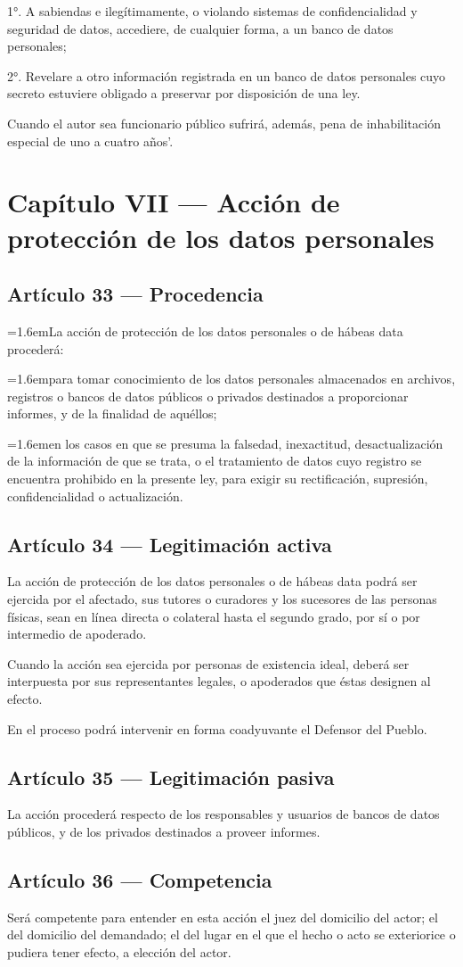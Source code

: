 \documentclass[10pt,a4paper]{article}
\newcommand{\articulo}[1]{\subsection{#1}}
\newcommand{\inciso}[2]{\par{\hangindent=1.6em\hangafter=1\makebox[1.6em][l]{#1}#2\par}}
\begin{document}
1°. A sabiendas e ilegítimamente, o violando sistemas de confidencialidad y seguridad de datos, accediere, de cualquier forma, a un banco de datos personales;

2°. Revelare a otro información registrada en un banco de datos personales cuyo secreto estuviere obligado a preservar por disposición de una ley.

Cuando el autor sea funcionario público sufrirá, además, pena de inhabilitación especial de uno a cuatro años'.

\section{Capítulo VII --- Acción de protección de los datos personales}
\articulo{Artículo 33 --- Procedencia}
\inciso{1.}{La acción de protección de los datos personales o de hábeas data procederá:}

\inciso{a)}{para tomar conocimiento de los datos personales almacenados en archivos, registros o bancos de datos públicos o privados destinados a proporcionar informes, y de la finalidad de aquéllos;}

\inciso{b)}{en los casos en que se presuma la falsedad, inexactitud, desactualización de la información de que se trata, o el tratamiento de datos cuyo registro se encuentra prohibido en la presente ley, para exigir su rectificación, supresión, confidencialidad o actualización.}

\articulo{Artículo 34 --- Legitimación activa}
La acción de protección de los datos personales o de hábeas data podrá ser ejercida por el afectado, sus tutores o curadores y los sucesores de las personas físicas, sean en línea directa o colateral hasta el segundo grado, por sí o por intermedio de apoderado.

Cuando la acción sea ejercida por personas de existencia ideal, deberá ser interpuesta por sus representantes legales, o apoderados que éstas designen al efecto.

En el proceso podrá intervenir en forma coadyuvante el Defensor del Pueblo.

\articulo{Artículo 35 --- Legitimación pasiva}
La acción procederá respecto de los responsables y usuarios de bancos de datos públicos, y de los privados destinados a proveer informes.

\articulo{Artículo 36 --- Competencia}
Será competente para entender en esta acción el juez del domicilio del actor; el del domicilio del demandado; el del lugar en el que el hecho o acto se exteriorice o pudiera tener efecto, a elección del actor.
\end{document}

